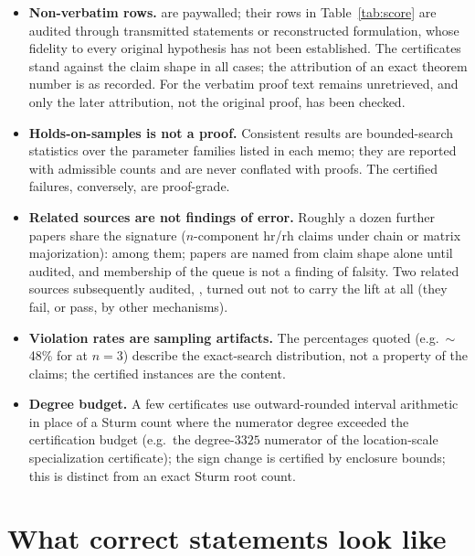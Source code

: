 \documentclass[10pt]{article}
\theoremstyle{plain}
\theoremstyle{definition}
\theoremstyle{remark}
\begin{document}
\begin{itemize}
\item \textbf{Non-verbatim rows.} \cite{HazraFinkelstein2018,NadebTorabi2022,BarmalzanKosariBalakrishnan2022,VargheseEtAl2025} are paywalled; their rows in Table~\ref{tab:score} are audited through transmitted statements or reconstructed formulation, whose fidelity to every original hypothesis has not been established. The certificates stand against the claim shape in all cases; the attribution of an exact theorem number is as recorded. For \cite{HazraFinkelstein2018} the verbatim proof text remains unretrieved, and only the later attribution, not the original proof, has been checked.
\item \textbf{Holds-on-samples is not a proof.} Consistent results are bounded-search statistics over the parameter families listed in each memo; they are reported with admissible counts and are never conflated with proofs. The certified failures, conversely, are proof-grade.
\item \textbf{Related sources are not findings of error.} Roughly a dozen further papers share the signature ($n$-component hr/rh claims under chain or matrix majorization): \cite{BarmalzanKosariZhang2021,SattariBarmalzanBalakrishnan2021,PanjaKunduPradhan2022,BhaktaMajumderKayalBalakrishnan2024,BhaktaKayalBalakrishnan2024,BhaktaBalakrishnanKayalPradhan2024,BhaktaKunduKayalAlizadeh2024,SahooMisraHazra2026,ShojaeeAsadiFinkelstein2023,KayalBhaktaBalakrishnan2023} among them; papers are named from claim shape alone until audited, and membership of the queue is not a finding of falsity. Two related sources subsequently audited, \cite{BhaktaTorradoDasKayal2024,BhaktaGuptaSaadatKiaKayal2025}, turned out not to carry the lift at all (they fail, or pass, by other mechanisms).
\item \textbf{Violation rates are sampling artifacts.} The percentages quoted (e.g.\ $\sim$48\% for \cite{GuoYan2024} at $n=3$) describe the exact-search distribution, not a property of the claims; the certified instances are the content.
\item \textbf{Degree budget.} A few certificates use outward-rounded interval arithmetic in place of a Sturm count where the numerator degree exceeded the certification budget (e.g.\ the degree-$3325$ numerator of the location-scale specialization certificate); the sign change is certified by enclosure bounds; this is distinct from an exact Sturm root count.
\end{itemize}

\section{What correct statements look like}\label{sec:fixes}
\end{document}
